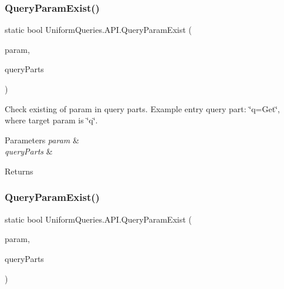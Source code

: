 \subsubsection{\texorpdfstring{Query\+Param\+Exist()}{QueryParamExist()}\hspace{0.1cm}{\footnotesize\ttfamily [2/3]}}
{\footnotesize\ttfamily static bool Uniform\+Queries.\+A\+P\+I.\+Query\+Param\+Exist (\begin{DoxyParamCaption}\item[{string}]{param,  }\item[{params string \mbox{[}$\,$\mbox{]}}]{query\+Parts }\end{DoxyParamCaption})\hspace{0.3cm}{\ttfamily [static]}}



Check existing of param in query parts. Example entry query part\+: \char`\"{}q=\+Get\char`\"{}, where target param is \char`\"{}q\char`\"{}. 


\begin{DoxyParams}{Parameters}
{\em param} & \\
\hline
{\em query\+Parts} & \\
\hline
\end{DoxyParams}
\begin{DoxyReturn}{Returns}

\end{DoxyReturn}
\mbox{\label{class_uniform_queries_1_1_a_p_i_ac0f8c9faebdc4a69f2072c0bb9e955e1}} 
\subsubsection{\texorpdfstring{Query\+Param\+Exist()}{QueryParamExist()}\hspace{0.1cm}{\footnotesize\ttfamily [3/3]}}
{\footnotesize\ttfamily static bool Uniform\+Queries.\+A\+P\+I.\+Query\+Param\+Exist (\begin{DoxyParamCaption}\item[{string}]{param,  }\item[{params \mbox{\hyperlink{struct_uniform_queries_1_1_query_part}{Query\+Part}} \mbox{[}$\,$\mbox{]}}]{query\+Parts }\end{DoxyParamCaption})\hspace{0.3cm}{\ttfamily [static]}}



